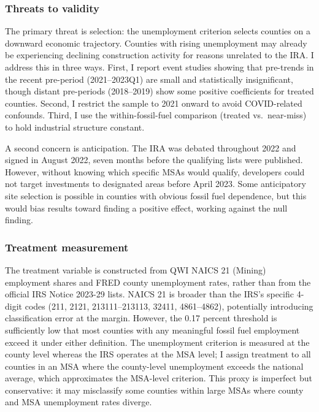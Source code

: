 \documentclass[12pt]{article}
\begin{document}
\subsubsection*{Threats to validity}
The primary threat is selection: the unemployment criterion selects counties on a downward economic trajectory. Counties with rising unemployment may already be experiencing declining construction activity for reasons unrelated to the IRA. I address this in three ways. First, I report event studies showing that pre-trends in the recent pre-period (2021--2023Q1) are small and statistically insignificant, though distant pre-periods (2018--2019) show some positive coefficients for treated counties. Second, I restrict the sample to 2021 onward to avoid COVID-related confounds. Third, I use the within-fossil-fuel comparison (treated vs.\ near-miss) to hold industrial structure constant.

A second concern is anticipation. The IRA was debated throughout 2022 and signed in August 2022, seven months before the qualifying lists were published. However, without knowing which specific MSAs would qualify, developers could not target investments to designated areas before April 2023. Some anticipatory site selection is possible in counties with obvious fossil fuel dependence, but this would bias results toward finding a positive effect, working against the null finding.

\subsubsection*{Treatment measurement}
The treatment variable is constructed from QWI NAICS 21 (Mining) employment shares and FRED county unemployment rates, rather than from the official IRS Notice 2023-29 lists. NAICS 21 is broader than the IRS's specific 4-digit codes (211, 2121, 213111--213113, 32411, 4861--4862), potentially introducing classification error at the margin. However, the 0.17 percent threshold is sufficiently low that most counties with any meaningful fossil fuel employment exceed it under either definition. The unemployment criterion is measured at the county level whereas the IRS operates at the MSA level; I assign treatment to all counties in an MSA where the county-level unemployment exceeds the national average, which approximates the MSA-level criterion. This proxy is imperfect but conservative: it may misclassify some counties within large MSAs where county and MSA unemployment rates diverge.
\end{document}

